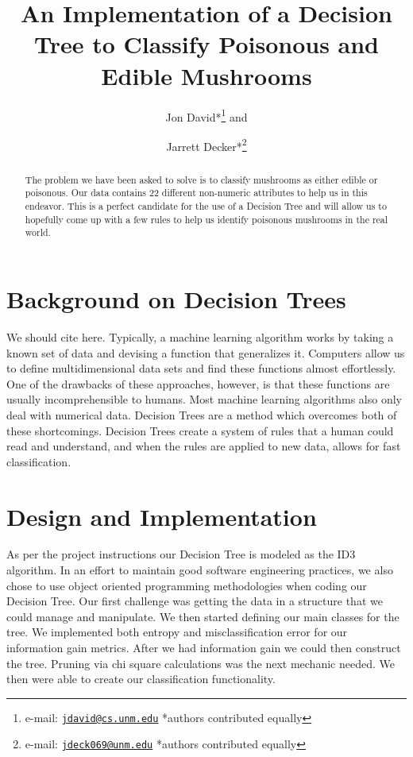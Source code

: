 \documentclass{IEEEtran}
\author{Jon David*\thanks{e-mail:
    \href{mailto:jdavid@cs.unm.edu}
         {\texttt{jdavid@cs.unm.edu}}
         {*authors contributed equally}} and
\and
       Jarrett Decker*\thanks{e-mail:
    \href{mailto:p.s.ortegel@gmail.com}
         {\texttt{jdeck069@unm.edu}}
         {*authors contributed equally}}}
\title{An Implementation of a Decision Tree to Classify Poisonous and
  Edible Mushrooms}
\begin{document}
\maketitle

\begin{abstract}

The problem we have been asked to solve is to classify mushrooms as
either edible or poisonous. Our data contains 22 different non-numeric
attributes to help us in this endeavor. This is a perfect candidate
for the use of a Decision Tree and will allow us to hopefully come up
with a few rules to help us identify poisonous mushrooms in the real
world. 
\end{abstract}

\section{Background on Decision Trees}
We should cite \parencite{mitchell1997machine} here.
Typically, a machine learning algorithm works by taking a known set of
data and devising a function that generalizes it. Computers allow us
to define multidimensional data sets and find these functions almost
effortlessly. One of the drawbacks of these approaches, however, is
that these functions are usually incomprehensible to humans. Most
machine learning algorithms also only deal with numerical
data. Decision Trees are a method which overcomes both of these
shortcomings. Decision Trees create a system of rules that a human
could read and understand, and when the rules are applied to new data,
allows for fast classification.


\section{Design and Implementation}
As per the project instructions our Decision Tree is modeled as the
ID3 algorithm. In an effort to maintain good software engineering
practices, we also chose to use object oriented programming
methodologies when coding our Decision Tree. Our first challenge was
getting the data in a structure that we could manage and
manipulate. We then started defining our main classes for the tree. We
implemented both entropy and misclassification error for our
information gain metrics. After we had information gain we could then
construct the tree. Pruning via chi square calculations was the next
mechanic needed. We then were able to create our classification
functionality.
\end{document}
